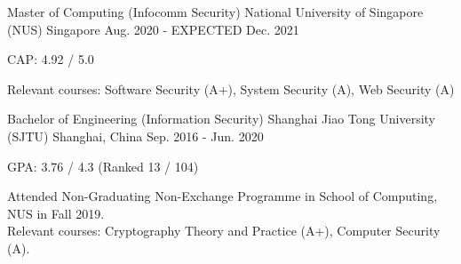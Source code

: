 


\begin{cventries}


    \cventry
    {Master of Computing (Infocomm Security)} %
    {National University of Singapore (NUS)} %
    {Singapore} %
    {Aug. 2020 - EXPECTED Dec. 2021} %
    {
        \begin{cvitems}
            \item CAP: 4.92 / 5.0
            \item Relevant courses: Software Security (A+), System Security (A), Web Security (A)
        \end{cvitems}
    } %


    \cventry
    {Bachelor of Engineering (Information Security)} %
    {Shanghai Jiao Tong University (SJTU)} %
    {Shanghai, China} %
    {Sep. 2016 - Jun. 2020} %
    { %
        \begin{cvitems}
            \item GPA: 3.76 / 4.3 (Ranked 13 / 104)
            \item Attended Non-Graduating Non-Exchange Programme in School of Computing, NUS in Fall 2019. \\
            Relevant courses: Cryptography Theory and Practice (A+), Computer Security (A).
        \end{cvitems}
    }


\end{cventries}
